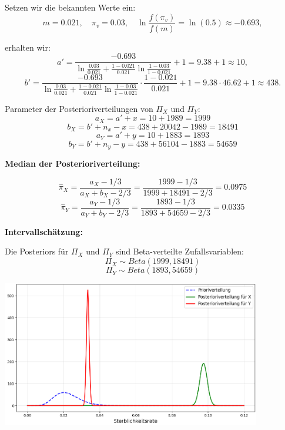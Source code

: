 \documentclass[a4paper,12pt]{article}
\begin{document}
Setzen wir die bekannten Werte ein:
\[
m = 0.021, \quad \pi_v = 0.03, \quad \ln \frac{f(\pi_v)}{f(m)} = \ln(0.5) \approx -0.693,
\]

erhalten wir:
\[
a' = \frac{-0.693}{\ln \frac{0.03}{0.021} + \frac{1-0.021}{0.021} \ln \frac{1-0.03}{1-0.021}} + 1 = 9.38 + 1 \approx 10,
\]
\[
b' = \frac{-0.693}{\ln \frac{0.03}{0.021} + \frac{1-0.021}{0.021} \ln \frac{1-0.03}{1-0.021}} \cdot \frac{1-0.021}{0.021} + 1 = 9.38 \cdot 46.62 + 1 \approx 438.
\]

Parameter der Posterioriverteilungen von $\Pi_X$ und $\Pi_Y$:
\begin{equation}
  a_X = a' + x = 10 + 1989 = 1999
\end{equation}
\begin{equation}
  b_X = b' + n_x - x = 438 + 20042 - 1989 = 18491
\end{equation}
\begin{equation}
  a_Y = a' + y = 10 + 1883 = 1893
\end{equation}
\begin{equation}
  b_Y = b' + n_y - y = 438 + 56104 - 1883 = 54659
\end{equation}

\textbf{Median der Posterioriverteilung:}

\begin{equation}
  \hat{\pi}_X = \frac{a_X - 1/3}{a_X + b_X - 2/3} = \frac{1999 - 1/3}{1999 + 18491 - 2/3} = 0.0975
\end{equation}
\begin{equation}
  \hat{\pi}_Y = \frac{a_Y - 1/3}{a_Y + b_Y - 2/3} = \frac{1893 - 1/3}{1893 + 54659 - 2/3} = 0.0335
\end{equation} 

\textbf{Intervallschätzung:}

Die Posteriors für $\Pi_X$ und $\Pi_Y$ sind Beta-verteilte Zufallsvariablen:
\begin{equation}
  \Pi_X \sim Beta(1999, 18491)
\end{equation}
\begin{equation}
  \Pi_Y \sim Beta(1893, 54659)
\end{equation}

\begin{center}
  \includegraphics[width=0.85\textwidth]{../images/semmelweis.png}
\end{center}
\end{document}

